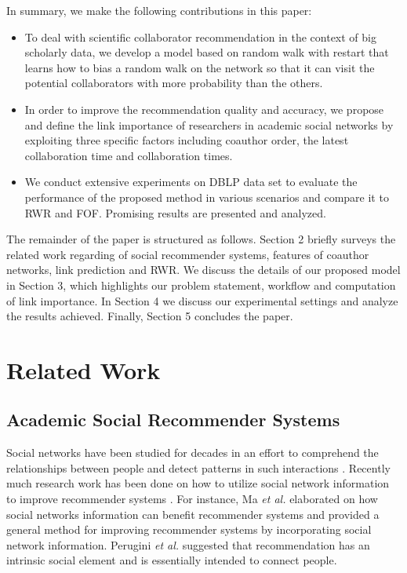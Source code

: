 \documentclass[10pt,journal,compsoc]{IEEEtran}
\begin{document}
In summary, we make the following contributions in this paper:
\begin{itemize}
\item To deal with scientific collaborator recommendation in the context of big scholarly data, we develop a model based on random walk with restart that learns how to bias a random walk on the network so that it can visit the potential collaborators with more probability than the others.
\item In order to improve the recommendation quality and accuracy, we propose and define the link importance of researchers in academic social networks by exploiting three specific factors including coauthor order, the latest collaboration time and collaboration times.
\item We conduct extensive experiments on DBLP data set to evaluate the performance of the proposed method in various scenarios and compare it to RWR and FOF. Promising results are presented and analyzed.
\end{itemize}

The remainder of the paper is structured as follows. Section 2 briefly surveys the related work regarding of social recommender systems, features of coauthor networks, link prediction and RWR. We discuss the details of our proposed model in Section 3, which highlights our problem statement, workflow and computation of link importance. In Section 4 we discuss our experimental settings and analyze the results achieved. Finally, Section 5 concludes the paper.


\section{Related Work}

\subsection{Academic Social Recommender Systems}
Social networks have been studied for decades in an effort to comprehend the relationships between people and detect patterns in such interactions \cite{Barabasi:linked}. Recently much research work has been done on how to utilize social network information to improve recommender systems \cite{Freyne:Social, He:SNRS}. For instance, Ma \textit{et al.} \cite{Ma:Recommender} elaborated on how social networks information can benefit recommender systems and provided a general method for improving recommender systems by incorporating social network information. Perugini \textit{et al.} \cite{Perugini:Recommender} suggested that recommendation has an intrinsic social element and is essentially intended to connect people.
\end{document}
